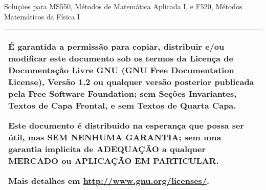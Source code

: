 % 
% 
% 
% 
% 
%
\begin{center}
    \LARGE{Solu\c{c}\~{o}es para MS550, M\'{e}todos de Matem\'{a}tica Aplicada I, e F520, M\'{e}todos Matem\'{a}ticos da F\'{i}sica I}
    
    \Large{\mycheader}
\end{center}
\vspace{.5\textheight}

\begin{tabular}{|p{}|}
\hline
\'{E} garantida a permiss\~{a}o para copiar, distribuir e/ou modificar este documento sob os termos da Licen\c{c}a de Documenta\c{c}\~{a}o Livre GNU (GNU Free Documentation License), Vers\~{a}o 1.2 ou qualquer vers\~{a}o posterior publicada pela Free Software Foundation; sem Se\c{c}\~{o}es Invariantes, Textos de Capa Frontal, e sem Textos de Quarta Capa.

Este documento \'{e} distribuido na esperança que possa ser \'{u}til, mas SEM NENHUMA GARANTIA; sem uma garantia implicita de ADEQUA\c{C}\~{A}O a qualquer MERCADO ou APLICA\c{C}\~{A}O EM PARTICULAR.

Mais detalhes em \url{http://www.gnu.org/licenses/}.
\\ \hline
\end{tabular}
